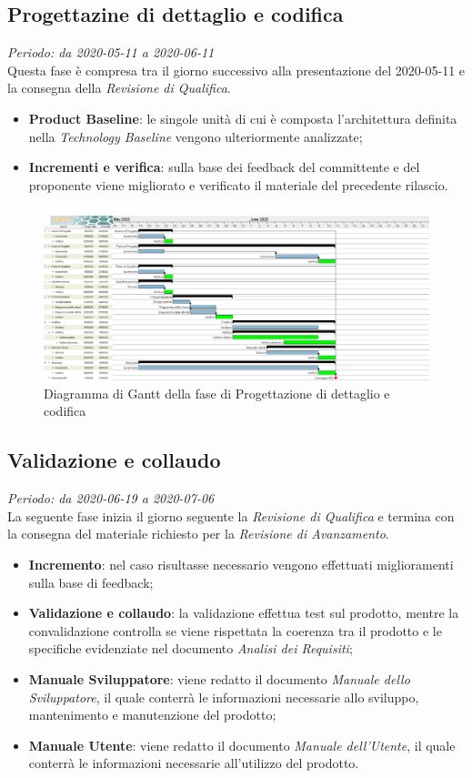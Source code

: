 \subsection{Progettazine di dettaglio e codifica}
\textit{Periodo: da 2020-05-11 a 2020-06-11}\\
Questa fase è compresa tra il giorno successivo alla presentazione del 2020-05-11 e la consegna della \textit{Revisione di Qualifica}.
\begin{itemize}
\item \textbf{Product Baseline}: le singole unità di cui è composta l'architettura definita nella \textit{Technology Baseline} vengono ulteriormente analizzate;
\item \textbf{Incrementi e verifica}: sulla base dei feedback del committente e del proponente viene migliorato e verificato il materiale del precedente rilascio.
\end{itemize}

\begin{figure}[H]
\centering
\includegraphics[scale=0.24]{./img/gantt/progettazione_dettaglio_codifica.png}
\caption{Diagramma di Gantt della fase di Progettazione di dettaglio e codifica}
\end{figure}

\subsection{Validazione e collaudo}
\textit{Periodo: da 2020-06-19 a 2020-07-06}\\
La seguente fase inizia il giorno seguente la \textit{Revisione di Qualifica} e termina con la consegna del materiale richiesto per la \textit{Revisione di Avanzamento}.
\begin{itemize}
\item \textbf{Incremento}: nel caso risultasse necessario vengono effettuati miglioramenti sulla base di feedback;
\item \textbf{Validazione e collaudo}: la validazione effettua test sul prodotto, mentre la convalidazione controlla se viene rispettata la coerenza tra il prodotto e le specifiche evidenziate nel documento \textit{Analisi dei Requisiti};
\item \textbf{Manuale Sviluppatore}: viene redatto il documento \textit{Manuale dello Sviluppatore}, il quale conterrà le informazioni necessarie allo sviluppo, mantenimento e manutenzione del prodotto;
\item \textbf{Manuale Utente}: viene redatto il documento \textit{Manuale dell'Utente}, il quale conterrà le informazioni necessarie all'utilizzo del prodotto.
\end{itemize}

